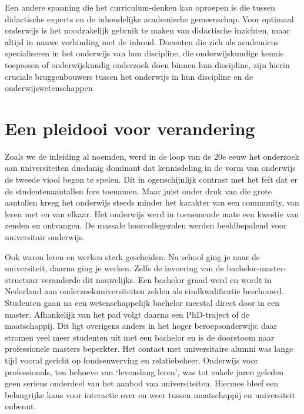 \documentclass{jote-book}
\begin{document}
	Een andere spanning die het curriculum-denken kan oproepen is die tussen didactische experts en de inhoudelijke academische gemeenschap. Voor optimaal onderwijs is het noodzakelijk gebruik te maken van didactische inzichten, maar altijd in nauwe verbinding met de inhoud. Docenten die zich als academicus specialiseren in het onderwijs van hun discipline, die onderwijskundige kennis toepassen of onderwijskundig onderzoek doen binnen hun discipline, zijn hierin cruciale bruggenbouwers tussen het onderwijs in hun discipline en de onderwijswetenschappen



	\section{Een pleidooi voor verandering}



	Zoals we de inleiding al noemden, werd in de loop van de 20e eeuw het onderzoek aan universiteiten dusdanig dominant dat kennisdeling in de vorm van onderwijs de tweede viool begon te spelen. Dit in ogenschijnlijk contrast met het feit dat er de studentenaantallen fors toenamen. Maar juist onder druk van die grote aantallen kreeg het onderwijs steeds minder het karakter van een community, van leren met en van elkaar. Het onderwijs werd in toenemende mate een kwestie van zenden en ontvangen. De massale hoorcollegezalen werden beeldbepalend voor universitair onderwijs.



	Ook waren leren en werken sterk gescheiden. Na school ging je naar de universiteit, daarna ging je werken. Zelfs de invoering van de bachelor-master-structuur veranderde dit nauwelijks. Een bachelor graad werd en wordt in Nederland aan onderzoekuniversiteiten zelden als eindkwalificatie beschouwd. Studenten gaan na een wetenschappelijk bachelor meestal direct door in een master. Afhankelijk van het pad volgt daarna een PhD-traject of de maatschappij. Dit ligt overigens anders in het hoger beroepsonderwijs: daar stromen veel meer studenten uit met een bachelor en is de doorstoom naar professionele masters beperkter. Het contact met universitaire alumni was lange tijd vooral gericht op fondsenwerving en relatiebeheer. Onderwijs voor professionals, ten behoeve van ‘levenslang leren', was tot enkele jaren geleden geen serieus onderdeel van het aanbod van universiteiten. Hiermee bleef een belangrijke kans voor interactie over en weer tussen maatschappij en universiteit onbenut.
\end{document}
